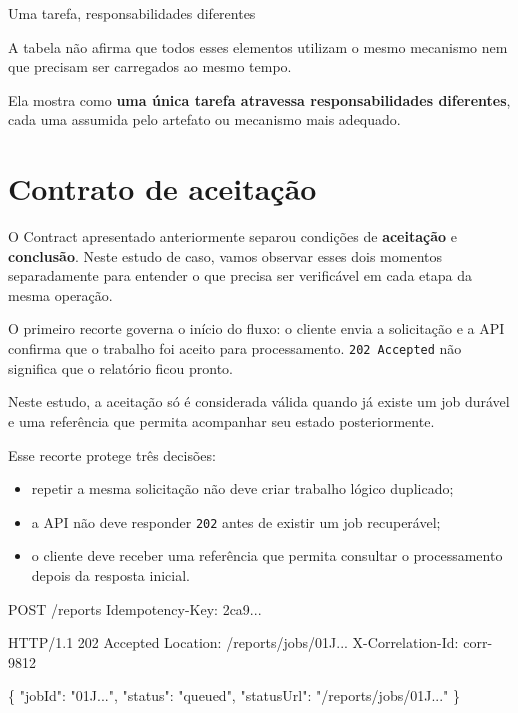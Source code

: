 \documentclass[
  10pt,
  a4paper,
  oneside]{book}
\newenvironment{Shaded}{}{}
\newcommand{\NormalTok}[1]{#1}
\providecommand{\tightlist}{%
  \setlength{\itemsep}{0pt}\setlength{\parskip}{0pt}}
\renewenvironment{Shaded}{\begin{snugshade}}{\end{snugshade}}%
\begin{document}
\begin{infobox}{Uma tarefa, responsabilidades diferentes}

A tabela não afirma que todos esses elementos utilizam o mesmo mecanismo
nem que precisam ser carregados ao mesmo tempo.

Ela mostra como \textbf{uma única tarefa atravessa responsabilidades
diferentes}, cada uma assumida pelo artefato ou mecanismo mais adequado.

\end{infobox}

\hypertarget{contrato-de-aceitauxe7uxe3o}{%
\section{Contrato de aceitação}\label{contrato-de-aceitauxe7uxe3o}}

O Contract apresentado anteriormente separou condições de
\textbf{aceitação} e \textbf{conclusão}. Neste estudo de caso, vamos
observar esses dois momentos separadamente para entender o que precisa
ser verificável em cada etapa da mesma operação.

O primeiro recorte governa o início do fluxo: o cliente envia a
solicitação e a API confirma que o trabalho foi aceito para
processamento. \texttt{202\ Accepted} não significa que o relatório
ficou pronto.

Neste estudo, a aceitação só é considerada válida quando já existe um
job durável e uma referência que permita acompanhar seu estado
posteriormente.

Esse recorte protege três decisões:

\begin{itemize}
\tightlist
\item
  repetir a mesma solicitação não deve criar trabalho lógico duplicado;
\item
  a API não deve responder \texttt{202} antes de existir um job
  recuperável;
\item
  o cliente deve receber uma referência que permita consultar o
  processamento depois da resposta inicial.
\end{itemize}

\begin{Shaded}
\begin{Highlighting}[]
\NormalTok{POST /reports}
\NormalTok{Idempotency{-}Key: 2ca9...}

\NormalTok{HTTP/1.1 202 Accepted}
\NormalTok{Location: /reports/jobs/01J...}
\NormalTok{X{-}Correlation{-}Id: corr{-}9812}

\NormalTok{\{}
\NormalTok{  "jobId": "01J...",}
\NormalTok{  "status": "queued",}
\NormalTok{  "statusUrl": "/reports/jobs/01J..."}
\NormalTok{\}}
\end{Highlighting}
\end{Shaded}
\end{document}
